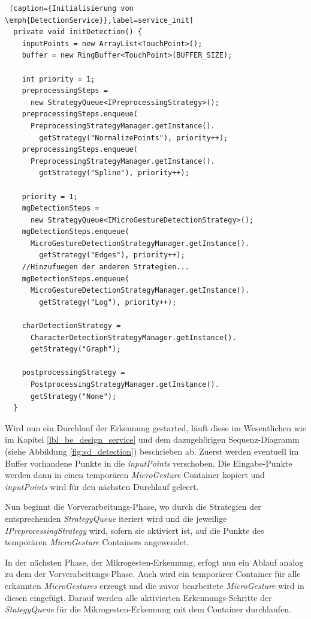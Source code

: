 \begin{lstlisting} [caption={Initialisierung von \emph{DetectionService}},label=service_init]
  private void initDetection() {
    inputPoints = new ArrayList<TouchPoint>();
    buffer = new RingBuffer<TouchPoint>(BUFFER_SIZE);

    int priority = 1;
    preprocessingSteps = 
      new StrategyQueue<IPreprocessingStrategy>();
    preprocessingSteps.enqueue(
      PreprocessingStrategyManager.getInstance().
        getStrategy("NormalizePoints"), priority++);
    preprocessingSteps.enqueue(
      PreprocessingStrategyManager.getInstance().
        getStrategy("Spline"), priority++);	

    priority = 1;
    mgDetectionSteps = 
      new StrategyQueue<IMicroGestureDetectionStrategy>();
    mgDetectionSteps.enqueue(
      MicroGestureDetectionStrategyManager.getInstance().
        getStrategy("Edges"), priority++);
    //Hinzufuegen der anderen Strategien...
    mgDetectionSteps.enqueue(
      MicroGestureDetectionStrategyManager.getInstance().
        getStrategy("Log"), priority++);

    charDetectionStrategy = 
      CharacterDetectionStrategyManager.getInstance().
      getStrategy("Graph");

    postprocessingStrategy = 
      PostprocessingStrategyManager.getInstance().
      getStrategy("None");
  }
\end{lstlisting}

Wird nun ein Durchlauf der Erkennung gestarted, läuft diese im Wesentlichen wie im Kapitel \ref{lbl_be_design_service} und dem dazugehörigen Sequenz-Diagramm (siehe Abbildung \ref{fig:sd_detection}) beschrieben ab. Zuerst werden eventuell im Buffer vorhandene Punkte in die \emph{inputPoints} verschoben. Die Eingabe-Punkte werden dann in einen temporären \emph{MicroGesture} Container kopiert und \emph{inputPoints} wird für den nächsten Durchlauf geleert.

Nun beginnt die Vorverarbeitungs-Phase, wo durch die Strategien der entsprechenden \emph{StrategyQueue} iteriert wird und die jeweilige \emph{IPreprocessingStrategy} wird, sofern sie aktiviert ist, auf die Punkte des temporären \emph{MicroGesture} Containers angewendet.

In der nächsten Phase, der Mikrogesten-Erkennung, erfogt nun ein Ablauf analog zu dem der Vorverabeitungs-Phase. Auch wird ein temporärer Container für alle erkannten \emph{MicroGestures} erzeugt und die zuvor bearbeitete \emph{MicroGesture} wird in diesen eingefügt. Darauf werden alle aktivierten Erkennungs-Schritte der \emph{StategyQueue} für die Mikrogesten-Erkennung mit dem Container durchlaufen.

